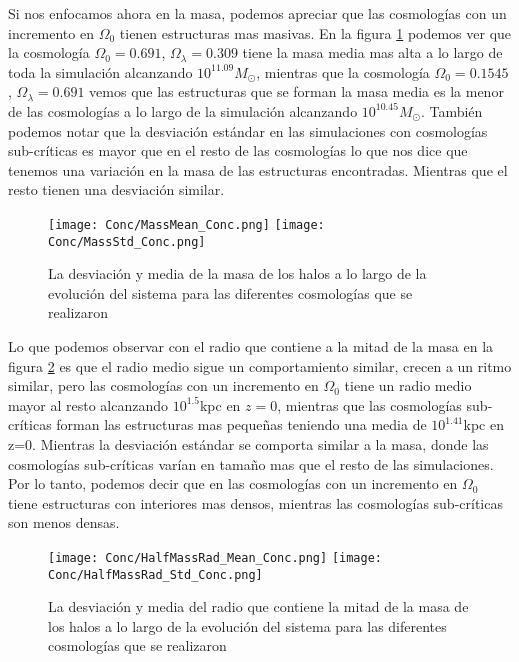 Si nos enfocamos ahora en la masa, podemos apreciar que las cosmologías con un incremento en $\Omega_0$ tienen estructuras mas masivas. En la figura \ref{fig:Conc_Mass} podemos ver que la cosmología $\Omega_0=0.691$, $\Omega_\lambda=0.309$ tiene la masa media mas alta a lo largo de toda la simulación alcanzando $10^{11.09}M_\odot$, mientras que la cosmología $\Omega_0=0.1545$, $\Omega_\lambda=0.691$ vemos que las estructuras que se forman la masa media es la menor de las cosmologías a lo largo de la simulación alcanzando $10^{10.45} M_\odot$. También podemos notar que la desviación estándar en las simulaciones con cosmologías sub-críticas es mayor que en el resto de las cosmologías lo que nos dice que tenemos una variación en la masa de las estructuras encontradas. Mientras que el resto tienen una desviación similar.

\begin{figure}[H]
      \centering
      \texttt{[image: Conc/MassMean\_Conc.png]}
      \texttt{[image: Conc/MassStd\_Conc.png]}
      \caption[Evolución de la desviación y media de la masa de los halos para todas las cosmologías]{La desviación y media de la masa de los halos a lo largo de la evolución del sistema para las diferentes cosmologías que se realizaron}
      \label{fig:Conc_Mass}
\end{figure}

Lo que podemos observar con el radio que contiene a la mitad de la masa en la figura \ref{fig:Conc_HalfMassRad} es que el radio medio sigue un comportamiento similar, crecen a un ritmo similar, pero las cosmologías con un incremento en $\Omega_0$ tiene un radio medio mayor al resto alcanzando $10^1.5$kpc en $z=0$, mientras que las cosmologías sub-críticas forman las estructuras mas pequeñas teniendo una media de $10^1.41$kpc en z=0. Mientras la desviación estándar se comporta similar a la masa, donde las cosmologías sub-críticas varían en tamaño mas que el resto de las simulaciones. Por lo tanto, podemos decir que en las cosmologías con un incremento en $\Omega_0$ tiene estructuras con interiores mas densos, mientras las cosmologías sub-críticas son menos densas.

\begin{figure}[H]
      \centering
      \texttt{[image: Conc/HalfMassRad\_Mean\_Conc.png]}
      \texttt{[image: Conc/HalfMassRad\_Std\_Conc.png]}
      \caption[Evolución de la desviación y media del radio que contiene la mitad de la masa de los halos para todas las cosmologías]{La desviación y media del radio que contiene la mitad de la masa de los halos a lo largo de la evolución del sistema para las diferentes cosmologías que se realizaron}
      \label{fig:Conc_HalfMassRad}
\end{figure}

